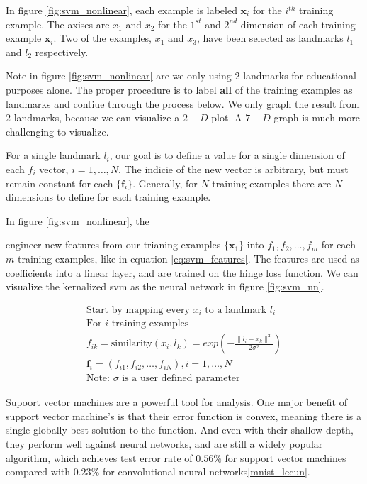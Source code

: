 \documentclass[11pt]{article}
\begin{document}
In figure \ref{fig:svm_nonlinear}, each example is labeled $\mathbf{x}_{i}$ for the $i^{th}$ training example. The axises are $x_{1}$ and $x_{2}$ for the $1^{st}$ and $2^{nd}$ dimension of each training example $\mathbf{x}_{i}$. Two of the examples, $x_{1}$ and $x_{3}$, have been selected as landmarks $l_{1}$ and $l_{2}$ respectively. 

Note in figure \ref{fig:svm_nonlinear} are we only using $2$ landmarks for educational purposes alone. The proper procedure is to label \textbf{all} of the training examples as landmarks and contiue through the process below. We only graph the result from $2$ landmarks, because we can visualize a $2-D$ plot. A $7-D$ graph is much more challenging to visualize.

For a single landmark  $l_{i}$, our goal is to define a value for a single dimension of each $f_{i}$ vector, $i = 1,\ldots,N$. The indicie of the new vector is arbitrary, but must remain constant for each $\{\mathbf{f}_{i}\}$. Generally, for $N$ training examples there are $N$ dimensions to define for each training example. 

In figure \ref{fig:svm_nonlinear}, the 

engineer new features from our trianing examples $\{\mathbf{x}_{1}\}$ into $f_{1},f_{2},\ldots,f_{m}$ for each $m$ training examples, like in equation \ref{eq:svm_features}. The features are used as coefficients into a linear layer, and are trained on the hinge loss function. We can visualize the kernalized svm as the neural network in figure \ref{fig:svm_nn}.

\begin{gather}
  \text{Start by mapping every } x_{i} \text{ to a landmark } l_{i}\nonumber\\
  \text{For }i \text{ training examples}\nonumber\\
  f_{ik} = \text{similarity}(x_{i},l_{k}) = exp(- \frac{\|l_{i} - x_{k}\|^{2}}{2\sigma ^{2}})\\
  \mathbf{f}_{i} = \left(f_{i1},f_{i2},\ldots,f_{iN}\right), i = 1,\ldots,N\nonumber\\
  \text{Note: } \sigma \text{ is a user defined parameter}\nonumber
  \label{eq:svm_features}
\end{gather}


Supoort vector machines are a powerful tool for analysis. One major benefit of support vector machine's is that their error function is convex, meaning there is a single globally best solution to the function. And even with their shallow depth, they perform well against neural networks, and are still a widely popular algorithm, which achieves test error rate of $0.56\%$ for support vector machines compared with $0.23\%$ for convolutional neural networks\ref{mnist_lecun}.
\end{document}
